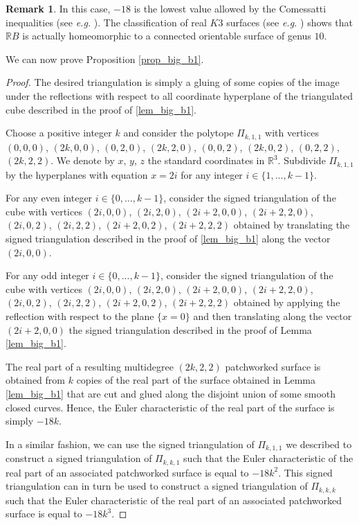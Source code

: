 \documentclass[12pt]{article}
\newcommand{\R}{\mathbb{R}}
\theoremstyle{definition}
\newtheorem{rmk}{Remark}[section]
\begin{document}
\begin{rmk}
    In this case, $-18$ is the lowest value allowed by the Comessatti inequalities (see \textit{e.g.} \cite{kharlamov}). The classification of real $K3$ surfaces (see \textit{e.g.} \cite{real_enriques}) shows that $\R B$ is actually homeomorphic to a connected orientable surface of genus $10$.
\end{rmk}

We can now prove Proposition \ref{prop_big_b1}.

\begin{proof}
    The desired triangulation is simply a gluing of some copies of the image under the reflections with respect to all coordinate hyperplane of the triangulated cube described in the proof of \ref{lem_big_b1}.

    Choose a positive integer $k$ and consider the polytope $\Pi_{k,1,1}$ with vertices $(0,0,0)$, $(2k,0,0)$, $(0,2,0)$, $(2k,2,0)$, $(0,0,2)$, $(2k,0,2)$, $(0,2,2)$, $(2k,2,2)$. We denote by $x$, $y$, $z$ the standard coordinates in $\R^3$. Subdivide $\Pi_{k,1,1}$ by the hyperplanes with equation $x = 2i$ for any integer $i \in \{1,...,k-1 \}$. 

    For any even integer $i \in \{0,...,k-1 \}$, consider the signed triangulation of the cube with vertices $(2i,0,0)$, $(2i,2,0)$, $(2i+2,0,0)$, $(2i+2,2,0)$, $(2i,0,2)$, $(2i,2,2)$, $(2i+2,0,2)$, $(2i+2,2,2)$ obtained by translating the signed triangulation described in the proof of \ref{lem_big_b1} along the vector $(2i,0,0)$.

    For any odd integer $i \in \{0,...,k-1 \}$, consider the signed triangulation of the cube with vertices $(2i,0,0)$, $(2i,2,0)$, $(2i+2,0,0)$, $(2i+2,2,0)$, $(2i,0,2)$, $(2i,2,2)$, $(2i+2,0,2)$, $(2i+2,2,2)$ obtained by applying the reflection with respect to the plane $\{ x=0 \}$ and then translating along the vector $(2i+2,0,0)$ the signed triangulation described in the proof of Lemma \ref{lem_big_b1}.

    The real part of a resulting multidegree $(2k,2,2)$ patchworked surface is obtained from $k$ copies of the real part of the surface obtained in Lemma \ref{lem_big_b1} that are cut and glued along the disjoint union of some smooth closed curves. Hence, the Euler characteristic of the real part of the surface is simply $-18k$.

    In a similar fashion, we can use the signed triangulation of $\Pi_{k,1,1}$ we described to construct a signed triangulation of $\Pi_{k,k,1}$ such that the Euler characteristic of the real part of an associated patchworked surface is equal to $-18k^2$. This signed triangulation can in turn be used to construct a signed triangulation of $\Pi_{k,k,k}$ such that the Euler characteristic of the real part of an associated patchworked surface is equal to $-18k^3$.
\end{proof}

%



\newpage


%
\end{document}
